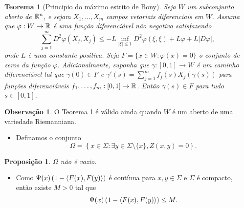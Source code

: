 \documentclass[10pt,a4paper]{beamer}
\newtheorem{teorema}{Teorema}
\newtheorem{proposicao}{Proposição}
\theoremstyle{definition}
\newtheorem{observacao}{Observação}
\begin{document}
\begin{frame}

	\begin{teorema}[Principio do máximo estrito de Bony]
		\label{bony's-strict-maximum-principe}
		Seja $W$ um subconjunto aberto de $\mathbb R^n$, e sejam $X_1, \ldots, X_m$ campos vetoriais diferenciais em $W$. Assuma que $\varphi: W \rightarrow \mathbb R$ é uma função diferenciável não negativa satisfazendo
		\begin{equation*}
			\sum_{j=1}^{m} D^2 \varphi (X_j,X_j) \leq -L \inf_{|\xi| \leq 1} D^2 \varphi(\xi,\xi) + L \varphi + L |D \varphi|,
		\end{equation*}
		onde $L$ é uma constante positiva. Seja $F= \{ x \in W: \varphi(x)=0 \}$ o conjunto de zeros da função $\varphi$. Adicionalmente, suponha que $\gamma: [0,1] \rightarrow W$ é um caminho diferenciável tal que $\gamma(0) \in F$ e $\gamma'(s) = \sum_{j=1}^{m} f_j(s) X_j(\gamma(s))$ para funções diferenciáveis $f_1, \ldots, f_m: [0,1] \rightarrow \mathbb R$. Então $\gamma(s) \in F$ para tudo $s \in [0,1]$.
	\end{teorema}

	\pause

	\begin{observacao}
		O Teorema \ref{bony's-strict-maximum-principe} é válido ainda quando $W$ é um aberto de uma variedade Riemanniana. 
	\end{observacao}

\end{frame}

\begin{frame}


%

	\begin{itemize}
		\item Definamos o conjunto
		\begin{equation*}
		\Omega = \left\{ x \in \Sigma: \exists y \in \Sigma \setminus \{ x \}, Z(x,y)=0 \right\}.
		\end{equation*}
	\end{itemize}

	\pause
	
	\begin{proposicao}
		$\Omega$ não é vazio.
	\end{proposicao}

	\pause
	
	\begin{itemize}
		\item Como $\Psi(x) \left( 1 - \left\langle F(x),F(y) \right\rangle \right)$ é contínua para $x,y \in \Sigma$ e $\Sigma$ é compacto, então existe $M>0$ tal que
		\begin{equation*}
			\Psi(x) \left( 1 - \left\langle F(x),F(y) \right\rangle \right) \leq M.
		\end{equation*}
		
	\end{itemize}	
		
\end{frame}
\end{document}
